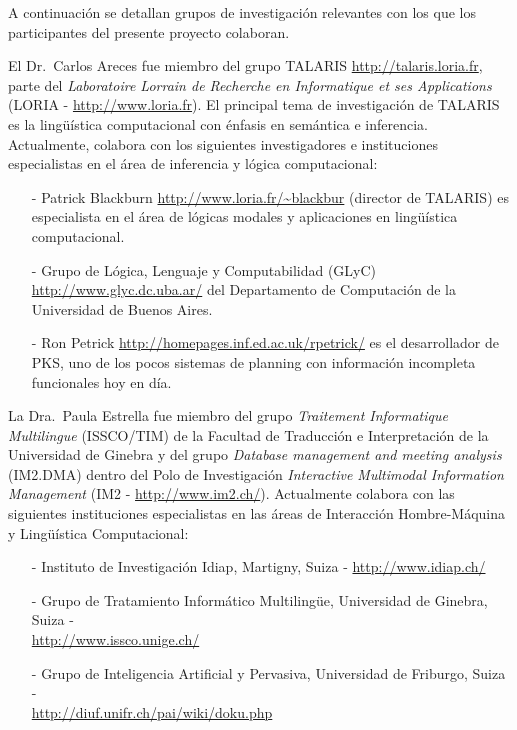 A continuaci\'on se detallan grupos de investigaci\'on relevantes con los que
los  participantes del presente proyecto colaboran.

El Dr.\ Carlos Areces fue miembro
del grupo TALARIS \url{http://talaris.loria.fr}, parte del
\emph{Laboratoire Lorrain de Recherche en Informatique et ses Applications}
(LORIA - \url{http://www.loria.fr}). El principal tema de investigaci\'on de
TALARIS es la ling\"u\'istica computacional con \'enfasis en sem\'antica e
inferencia. Actualmente, colabora con los siguientes investigadores e
instituciones especialistas en el \'area de inferencia y l\'ogica computacional:

\begin{itemize}
    \item[-]  Patrick Blackburn \url{http://www.loria.fr/~blackbur} (director de
TALARIS) es especialista en el \'area de l\'ogicas modales y aplicaciones
en ling\"u\'istica computacional.
\item[-] Grupo de L\'ogica, Lenguaje y Computabilidad (GLyC)
\url{http://www.glyc.dc.uba.ar/} del Departamento de Computaci\'on de la
Universidad
de Buenos Aires.
\item[-] Ron Petrick \url{http://homepages.inf.ed.ac.uk/rpetrick/} es el
desarrollador de PKS, uno de los pocos sistemas de planning con informaci\'on
incompleta funcionales hoy en d\'ia.
\end{itemize}

La Dra.\ Paula Estrella fue miembro del grupo \emph{Traitement 
Informatique Multilingue} (ISSCO/TIM) de la Facultad de Traducci\'on e
Interpretaci\'on 
de la Universidad de Ginebra y del grupo \emph{Database management and meeting
analysis} 
(IM2.DMA) dentro del Polo de Investigaci\'on \emph{Interactive Multimodal
Information 
Management} (IM2 - \url{http://www.im2.ch/}). Actualmente colabora con las
siguientes 
instituciones especialistas en las \'areas de Interacci\'on Hombre-M\'aquina y 
Ling\"u\'is\-tica Computacional:
\begin{itemize}
\item[-]  Instituto de Investigaci\'on Idiap, Martigny, Suiza - 
\url{http://www.idiap.ch/}
\item[-] Grupo de Tratamiento Inform\'atico Multiling\"ue, Universidad de
Ginebra, Suiza - \\ \url{http://www.issco.unige.ch/}
\item[-]  Grupo de Inteligencia Artificial y Pervasiva, Universidad de Friburgo,
Suiza - \\ \url{http://diuf.unifr.ch/pai/wiki/doku.php}
\end{itemize}

